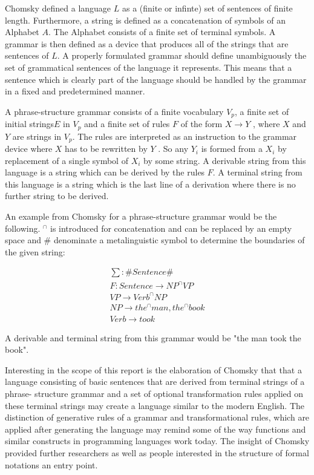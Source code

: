 \documentclass{article}
\begin{document}
Chomsky defined a language $L$ as a (finite or infinte) set of sentences of finite length. Furthermore, a string is defined as a concatenation of symbols of an Alphabet $A$. The Alphabet consists of a finite set of terminal symbols. A grammar is then defined as a device that produces all of the strings that are sentences of $L$. A properly formulated grammar should define unambiguously the set of grammatical sentences of the language it represents. This means that a sentence which is clearly part of the language should be handled by the grammar in a fixed and predetermined manner.

A phrase-structure grammar consists of a finite vocabulary $V_p$, a finite set of initial strings$E$ in $V_p$ and a finite set of rules $F$ of the form $X \to Y$ , where $X$ and $Y$ are strings in $V_p$. The rules are interpreted as an instruction to the grammar device where $X$ has to be rewritten by $Y$ . So any $Y_i$ is formed from a $X_i$ by replacement of a single symbol of $X_i$ by some string. A derivable string from this language is a string which can be derived by the rules $F$. A terminal string from this language is a string which is the last line of a derivation where there is no further string to be derived.

An example from Chomsky for a phrase-structure grammar would be the following. $^{\cap}$ is introduced for concatenation and can be replaced by an empty space and \# denominate a metalinguistic symbol to determine the boundaries of the given string:

\begin{align*}
	\sum : \# Sentence \# \\
	F: Sentence \to NP^{\cap}VP \\
	VP \to Verb^{\cap}NP \\
	NP \to the^{\cap}man, the^{\cap}book \\
	Verb \to took
\end{align*}

A derivable and terminal string from this grammar would be "the man took the book".

Interesting in the scope of this report is the elaboration of Chomsky that that a language consisting of basic sentences that are derived from terminal strings of a phrase- structure grammar and a set of optional transformation rules applied on these terminal strings may create a language similar to the modern English. The distinction of generative rules of a grammar and transformational rules, which are applied after generating the language may remind some of the way functions and similar constructs in programming languages work today. The insight of Chomsky provided further researchers as well as people interested in the structure of formal notations an entry point.
\end{document}
